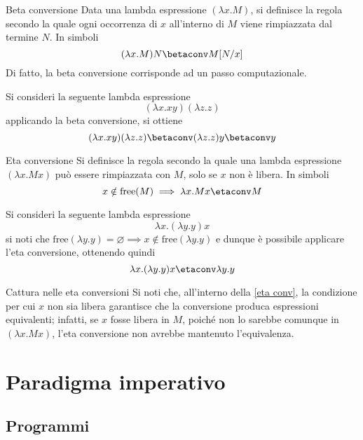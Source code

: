 \documentclass[a4paper, 12pt]{report}
\begin{document}
    \begin{frameddefn}{Beta conversione}
        Data una lambda espressione $(\lambda x.M)$, si definisce  la regola secondo la quale ogni occorrenza di $x$ all'interno di $M$ viene rimpiazzata dal termine $N$. In simboli $$(\lambda x.M)N \betaconv M[N/x]$$ Di fatto, la beta conversione corrisponde ad un passo computazionale.
    \end{frameddefn}

    \begin{example}
        Si consideri la seguente lambda espressione $$(\lambda x.xy)(\lambda z.z)$$ applicando la beta conversione, si ottiene $$(\lambda x.xy)(\lambda z.z) \betaconv (\lambda z.z)y \betaconv y$$
    \end{example}

    \begin{frameddefn}[label={eta conv}]{Eta conversione}
        Si definisce  la regola secondo la quale una lambda espressione $(\lambda x.Mx)$ può essere rimpiazzata con $M$, solo se $x$ non è libera. In simboli $$x \notin \mathrm{free}(M) \implies \lambda x.Mx \etaconv M$$
    \end{frameddefn}

    \begin{example}
        Si consideri la seguente lambda espressione $$\lambda x.(\lambda y.y)x$$ si noti che $\mathrm{free}(\lambda y.y) = \varnothing \implies x \notin \mathrm{free}(\lambda y.y)$ e dunque è possibile applicare l'eta conversione, ottenendo quindi $$\lambda x .(\lambda y.y) x \etaconv \lambda y.y$$
    \end{example}

    \begin{framedobs}{Cattura nelle eta conversioni}
        Si noti che, all'interno della \cref{eta conv}, la condizione per cui $x$ non sia libera garantisce che la conversione produca espressioni equivalenti; infatti, se $x$ fosse libera in $M$, poiché non lo sarebbe comunque in $(\lambda x.Mx)$, l'eta conversione non avrebbe mantenuto l'equivalenza.
    \end{framedobs}

    \chapter{Paradigma imperativo}

    \section{Programmi}
    
\end{document}
